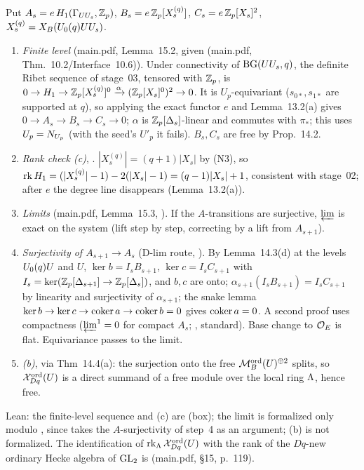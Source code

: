 \begin{outline}
Put $A_s=e\,H_1(\Gamma_{UU_s},\mathbb{Z}_p)$, $B_s=e\,\mathbb{Z}_p[X^{(q)}_s]$, $C_s=e\,\mathbb{Z}_p[X_s]^2$, $X^{(q)}_s=X_B(U_0(q)UU_s)$.
\begin{enumerate}[label=\arabic*.]
\item \emph{Finite level} (main.pdf, Lemma~15.2, \stproved{} given (main.pdf, Thm.~10.2/Interface~10.6)). Under connectivity of
  $\mathrm{BG}(UU_s,q)$, the definite Ribet sequence of stage~03, tensored with $\mathbb{Z}_p$, is
  $0\to H_1\to\mathbb{Z}_p[X^{(q)}_s]^0\xrightarrow{\alpha}(\mathbb{Z}_p[X_s]^0)^2\to0$. It is $U_p$-equivariant ($s_{0*},s_{1*}$ are supported at
  $q$), so applying the exact functor $e$ and Lemma~13.2(a) gives $0\to A_s\to B_s\to C_s\to0$; $\alpha$ is
  $\mathbb{Z}_p[\Delta_s]$-linear and commutes with $\pi_*$; this uses $U_p=N_{U_p}$ (with the seed's $U'_p$ it fails). $B_s,C_s$ are free by Prop.~14.2.
\item \emph{Rank check (c)}, \stproved. $|X^{(q)}_s|=(q+1)|X_s|$ by (N3), so
  $\operatorname{rk} H_1=(|X^{(q)}_s|-1)-2(|X_s|-1)=(q-1)|X_s|+1$, consistent with stage~02; after $e$ the degree line disappears
  (Lemma~13.2(a)).
\item \emph{Limits} (main.pdf, Lemma~15.3, \stproved). If the $A$-transitions are surjective, $\varprojlim$ is exact on the system
  (lift step by step, correcting by a lift from $A_{s+1}$).
\item \emph{Surjectivity of $A_{s+1}\to A_s$} (D-lim route, \stproved). By Lemma~14.3(d) at the levels $U_0(q)U$ and $U$,
  $\ker b=I_sB_{s+1}$, $\ker c=I_sC_{s+1}$ with $I_s=\ker(\mathbb{Z}_p[\Delta_{s+1}]\to\mathbb{Z}_p[\Delta_s])$, and $b,c$ are onto;
  $\alpha_{s+1}(I_sB_{s+1})=I_sC_{s+1}$ by linearity and surjectivity of $\alpha_{s+1}$; the snake lemma
  $\ker b\to\ker c\to\operatorname{coker} a\to\operatorname{coker} b=0$ gives $\operatorname{coker} a=0$. A second proof uses compactness ($\varprojlim^1=0$ for
  compact $A_s$; \stproved, standard). Base change to $\mathcal{O}_E$ is flat. Equivariance passes to the limit.
\item \emph{(b)}, \stproved{} via Thm~14.4(a): the surjection onto the free $\mathcal{M}^{\mathrm{ord}}_B(U)^{\oplus2}$ splits, so $\mathcal{X}^{\mathrm{ord}}_{Dq}(U)$ is a
  direct summand of a free module over the local ring $\Lambda$, hence free.
\end{enumerate}
Lean: the finite-level sequence and (c) are \stformal{} (box); the limit is formalized only modulo , since
 takes the $A$-surjectivity of step~4 as an argument; (b) is not formalized. The identification
of $\operatorname{rk}_\Lambda\mathcal{X}^{\mathrm{ord}}_{Dq}(U)$ with the rank of the $Dq$-new ordinary Hecke algebra of $\mathrm{GL}_2$ is \stexp{} (main.pdf, \S15, p.~119).
\end{outline}

